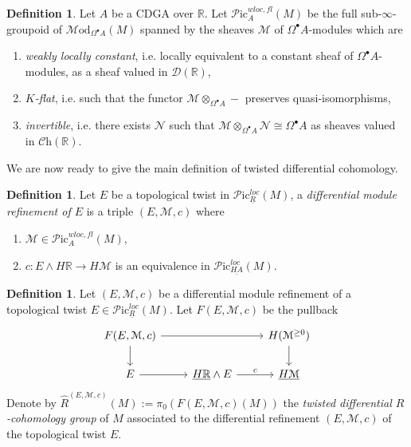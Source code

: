 \documentclass[a4paper]{book}
\newcommand{\lC}{\mathcal{C}}
\newcommand{\lD}{\mathcal{D}}
\newcommand{\lM}{\mathcal{M}}
\newcommand{\lN}{\mathcal{N}}
\newcommand{\lP}{\mathcal{P}}
\newcommand{\bR}{\mathbb{R}}
\newcommand{\Ch}{\lC\mathrm{h}} %
\newcommand{\Mod}{\lM\mathrm{od}} %
\newcommand{\Pic}{\lP\mathrm{ic}} %
\theoremstyle{definition}
\newtheorem{definition}[equation]{Definition}
\theoremstyle{remark}
\numberwithin{equation}{section}
\begin{document}
\begin{definition}
  Let $A$ be a CDGA over $\bR$. Let $\Pic^{wloc, fl}_A(M)$ be the full sub-$\infty$-groupoid of $\Mod_{\Omega^\bullet A}(M)$ spanned by the sheaves $\lM$ of $\Omega^\bullet A$-modules which are
  \begin{enumerate}
    \item \emph{weakly locally constant}, i.e. locally equivalent to a constant sheaf of $\Omega^\bullet A$-modules, as a sheaf valued in $\lD(\bR)$,
    \item \emph{$K$-flat}, i.e. such that the functor $\lM \otimes_{\Omega^\bullet A} -$ preserves quasi-isomorphisms,
    \item \emph{invertible}, i.e. there exists $\lN$ such that $\lM \otimes_{\Omega^\bullet A} \lN \cong \Omega^\bullet A$ as sheaves valued in $\Ch(\bR)$.
  \end{enumerate} 
\end{definition}

We are now ready to give the main definition of twisted differential cohomology.

\begin{definition}
  Let $E$ be a topological twist in $\Pic^{loc}_{\underline{R}}(M)$, a \emph{differential module refinement of $E$} is a triple $(E, \lM, c)$ where
  \begin{enumerate}
    \item $\lM \in \Pic^{wloc, fl}_A(M)$,
    \item $c\colon E \wedge H\bR \to H\lM$ is an equivalence in $\Pic^{loc}_{\underline{HA}}(M)$.
  \end{enumerate}
\end{definition}

\begin{definition}
  Let $(E, \lM, c)$ be a differential module refinement of a topological twist $E \in \Pic^{loc}_{\underline{R}}(M)$. Let $F(E,\lM,c)$ be the pullback
  \[
  \begin{tikzcd}
    F(E,\lM,c) \arrow[rr] \arrow[d] & & H(\lM^{\geq 0}) \arrow[d] \\
    E \arrow[r] & \underline{H\bR} \wedge E \arrow[r, "c"] &  \underline{H\lM} 
  \end{tikzcd}
  \]
  Denote by $\hat{R}^{(E,\lM,c)}(M) := \pi_0(F(E,\lM,c)(M))$ the \emph{twisted differential $R$-cohomology group} of $M$ associated to the differential refinement $(E,\lM,c)$ of the topological twist $E$.
\end{definition}
\end{document}

